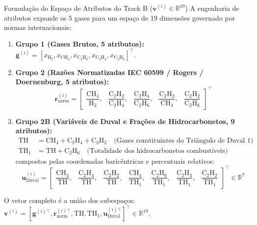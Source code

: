 \documentclass[11pt,a4paper]{article}
\begin{document}
\begin{mathBox}{Formulação do Espaço de Atributos do Track B ($\mathbf{v}^{(i)} \in \mathbb{R}^{19}$)}
A engenharia de atributos expande os 5 gases para um espaço de 19 dimensões governado por normas internacionais:
\begin{enumerate}
  \item \textbf{Grupo 1 (Gases Brutos, 5 atributos):} $\mathbf{g}^{(i)} = [x_{\text{H}_2}, x_{\text{CH}_4}, x_{\text{C}_2\text{H}_6}, x_{\text{C}_2\text{H}_4}, x_{\text{C}_2\text{H}_2}]^\top$.
  \item \textbf{Grupo 2 (Razões Normatizadas IEC 60599 / Rogers / Doernenburg, 5 atributos):}
  \begin{equation}
    \mathbf{r}_{\text{norm}}^{(i)} = \begin{bmatrix}
      \dfrac{\text{CH}_4}{\text{H}_2}, &
      \dfrac{\text{C}_2\text{H}_2}{\text{C}_2\text{H}_4}, &
      \dfrac{\text{C}_2\text{H}_4}{\text{C}_2\text{H}_6}, &
      \dfrac{\text{C}_2\text{H}_2}{\text{CH}_4}, &
      \dfrac{\text{C}_2\text{H}_2}{\text{C}_2\text{H}_6}
    \end{bmatrix}^\top
  \end{equation}
  \item \textbf{Grupo 2B (Variáveis de Duval e Frações de Hidrocarbonetos, 9 atributos):}
  \begin{align}
    \text{TH} &= \text{CH}_4 + \text{C}_2\text{H}_4 + \text{C}_2\text{H}_2 \quad \text{(Gases constituintes do Triângulo de Duval 1)} \\
    \text{TH}_1 &= \text{TH} + \text{C}_2\text{H}_6 \quad \text{(Totalidade dos hidrocarbonetos combustíveis)}
  \end{align}
  compostos pelas coordenadas baricêntricas e percentuais relativos:
  \begin{equation}
    \mathbf{u}_{\text{Duval}}^{(i)} = \begin{bmatrix} 
      \dfrac{\text{CH}_4}{\text{TH}}, & \dfrac{\text{C}_2\text{H}_4}{\text{TH}}, & \dfrac{\text{C}_2\text{H}_2}{\text{TH}}, &
      \dfrac{\text{CH}_4}{\text{TH}_1}, & \dfrac{\text{C}_2\text{H}_6}{\text{TH}_1}, & \dfrac{\text{C}_2\text{H}_4}{\text{TH}_1}, & \dfrac{\text{C}_2\text{H}_2}{\text{TH}_1}
    \end{bmatrix}^\top \in \mathbb{R}^7
  \end{equation}
\end{enumerate}
O vetor completo é a união dos subespaços: $\mathbf{v}^{(i)} = [\mathbf{g}^{(i)\top}, \mathbf{r}_{\text{norm}}^{(i)\top}, \text{TH}, \text{TH}_1, \mathbf{u}_{\text{Duval}}^{(i)\top}]^\top \in \mathbb{R}^{19}$.
\end{mathBox}
\end{document}
